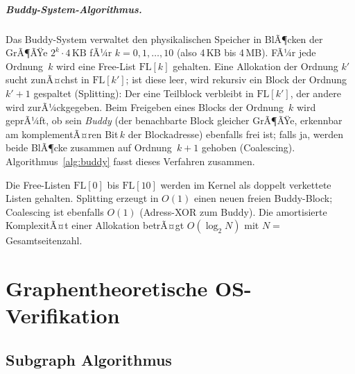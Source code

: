 ﻿\documentclass[a4paper,12pt]{scrreprt}
\theoremstyle{definition}
\begin{document}
	\paragraph{Buddy-System-Algorithmus.}
	Das Buddy-System verwaltet den physikalischen Speicher in BlÃ¶cken der
	GrÃ¶ÃŸe $2^k \cdot 4\,\text{KB}$ fÃ¼r $k = 0, 1, \ldots, 10$ (also 4\,KB
	bis 4\,MB). FÃ¼r jede Ordnung~$k$ wird eine Free-List $\mathrm{FL}[k]$
	gehalten. Eine Allokation der Ordnung $k'$ sucht zunÃ¤chst in
	$\mathrm{FL}[k']$; ist diese leer, wird rekursiv ein Block der Ordnung
	$k'+1$ gespaltet (Splitting): Der eine Teilblock verbleibt in
	$\mathrm{FL}[k']$, der andere wird zurÃ¼ckgegeben. Beim Freigeben eines
	Blocks der Ordnung~$k$ wird geprÃ¼ft, ob sein \emph{Buddy} (der benachbarte
	Block gleicher GrÃ¶ÃŸe, erkennbar am komplementÃ¤ren Bit\,$k$ der
	Blockadresse) ebenfalls frei ist; falls ja, werden beide BlÃ¶cke zusammen
	auf Ordnung~$k+1$ gehoben (Coalescing). Algorithmus~\ref{alg:buddy}
	fasst dieses Verfahren zusammen.

	\begin{algorithm}[H]
		\caption{EDF$^+$-bewusster Buddy-Allokator}
		\label{alg:buddy}
		\begin{algorithmic}[1]
			\State \Return {}
			\Else
			\State {} 
			\State \Return {}
			\EndIf
			\EndProcedure
		\end{algorithmic}
	\end{algorithm}

	Die Free-Listen $\mathrm{FL}[0]$ bis $\mathrm{FL}[10]$ werden im Kernel
	als doppelt verkettete Listen gehalten. Splitting erzeugt in $O(1)$
	einen neuen freien Buddy-Block; Coalescing ist ebenfalls $O(1)$
	(Adress-XOR zum Buddy). Die amortisierte KomplexitÃ¤t einer Allokation
	betrÃ¤gt $O(\log_2 N)$ mit $N = $ Gesamtseitenzahl.
	
	\chapter{Graphentheoretische OS-Verifikation}
	
	\section{Subgraph Algorithmus}
\end{document}
